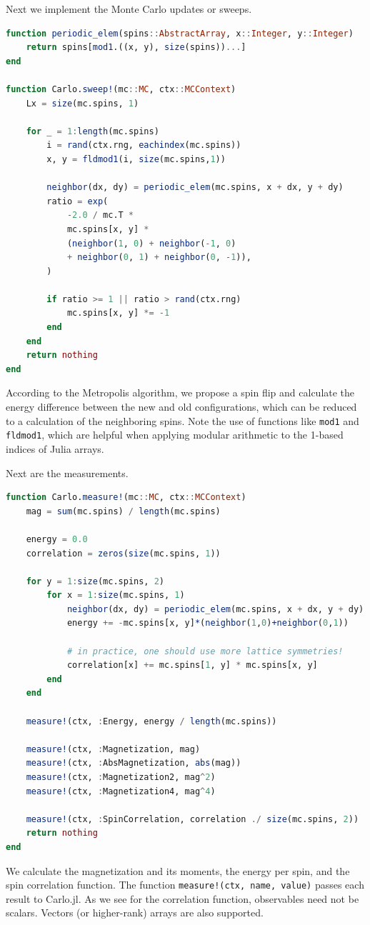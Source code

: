 \documentclass{SciPost}
\begin{document}
Next we implement the Monte Carlo updates or sweeps.
\begin{lstlisting}[language=julia]
function periodic_elem(spins::AbstractArray, x::Integer, y::Integer)
    return spins[mod1.((x, y), size(spins))...]
end

function Carlo.sweep!(mc::MC, ctx::MCContext)
    Lx = size(mc.spins, 1)

    for _ = 1:length(mc.spins)
        i = rand(ctx.rng, eachindex(mc.spins))
        x, y = fldmod1(i, size(mc.spins,1))

        neighbor(dx, dy) = periodic_elem(mc.spins, x + dx, y + dy)
        ratio = exp(
            -2.0 / mc.T *
            mc.spins[x, y] *
            (neighbor(1, 0) + neighbor(-1, 0)
            + neighbor(0, 1) + neighbor(0, -1)),
        )

        if ratio >= 1 || ratio > rand(ctx.rng)
            mc.spins[x, y] *= -1
        end
    end
    return nothing
end
\end{lstlisting}
According to the Metropolis algorithm, we propose a spin flip and calculate the energy difference between the new and old configurations, which can be reduced to a calculation of the neighboring spins. Note the use of functions like \texttt{mod1} and \texttt{fldmod1}, which are helpful when applying modular arithmetic to the 1-based indices of Julia arrays.

Next are the measurements.
\begin{lstlisting}[language=julia]
function Carlo.measure!(mc::MC, ctx::MCContext)
    mag = sum(mc.spins) / length(mc.spins)

    energy = 0.0
    correlation = zeros(size(mc.spins, 1))

    for y = 1:size(mc.spins, 2)
        for x = 1:size(mc.spins, 1)
            neighbor(dx, dy) = periodic_elem(mc.spins, x + dx, y + dy)
            energy += -mc.spins[x, y]*(neighbor(1,0)+neighbor(0,1))

            # in practice, one should use more lattice symmetries!
            correlation[x] += mc.spins[1, y] * mc.spins[x, y]
        end
    end

    measure!(ctx, :Energy, energy / length(mc.spins))

    measure!(ctx, :Magnetization, mag)
    measure!(ctx, :AbsMagnetization, abs(mag))
    measure!(ctx, :Magnetization2, mag^2)
    measure!(ctx, :Magnetization4, mag^4)

    measure!(ctx, :SpinCorrelation, correlation ./ size(mc.spins, 2))
    return nothing
end
\end{lstlisting}
We calculate the magnetization and its moments, the energy per spin, and the spin correlation function. The function \texttt{measure!(ctx, name, value)} passes each result to Carlo.jl. As we see for the correlation function, observables need not be scalars. Vectors (or higher-rank) arrays are also supported.
\end{document}
